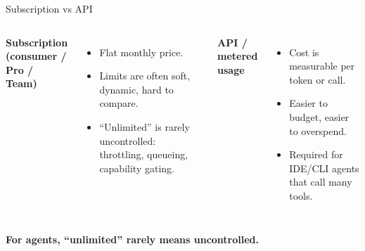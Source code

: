 

\begin{frame}{Subscription vs API}
  \begin{columns}[T,onlytextwidth]
      \textbf{Subscription (consumer / Pro / Team)}
      \begin{itemize}\setlength\itemsep{0.3em}
        \item Flat monthly price.
        \item Limits are often soft, dynamic, hard to compare.
        \item ``Unlimited'' is rarely uncontrolled: throttling, queueing, capability gating.
      \end{itemize}
      \textbf{API / metered usage}
      \begin{itemize}\setlength\itemsep{0.3em}
        \item Cost is measurable per token or call.
        \item Easier to budget, easier to overspend.
        \item Required for IDE/CLI agents that call many tools.
      \end{itemize}
  \end{columns}
  \vspace{0.5cm}
  \begin{center}\Large\color{accent}\bfseries For agents, ``unlimited'' rarely means uncontrolled.\end{center}
 
\end{frame}


